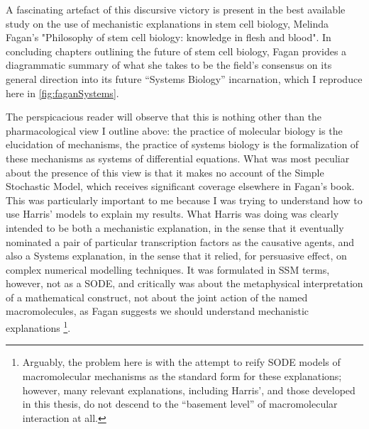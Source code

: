 A fascinating artefact of this discursive victory is present in the best available study on the use of mechanistic explanations in stem cell biology, Melinda Fagan's "Philosophy of stem cell biology: knowledge in flesh and blood". In concluding chapters outlining the future of stem cell biology, Fagan provides a diagrammatic summary of what she takes to be the field's consensus on its general direction into its future ``Systems Biology'' incarnation, which I reproduce here in \autoref{fig:faganSystems}.

The perspicacious reader will observe that this is nothing other than the pharmacological view I outline above: the practice of molecular biology is the elucidation of mechanisms, the practice of systems biology is the formalization of these mechanisms as systems of differential equations. What was most peculiar about the presence of this view is that it makes no account of the Simple Stochastic Model, which receives significant coverage elsewhere in Fagan's book. This was particularly important to me because I was trying to understand how to use Harris' models to explain my results. What Harris was doing was clearly intended to be both a mechanistic explanation, in the sense that it eventually nominated a pair of particular transcription factors as the causative agents, and also a Systems explanation, in the sense that it relied, for persuasive effect, on complex numerical modelling techniques. It was formulated in SSM terms, however, not as a SODE, and critically was about the metaphysical interpretation of a mathematical construct, not about the joint action of the named macromolecules, as Fagan suggests we should understand mechanistic explanations \cite{Fagan2013}\footnote{Arguably, the problem here is with the attempt to reify SODE models of macromolecular mechanisms as the standard form for these explanations; however, many relevant explanations, including Harris', and those developed in this thesis, do not descend to the ``basement level'' of macromolecular interaction at all.}.

